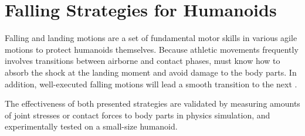 \section{Falling Strategies for Humanoids}
Falling and landing motions are a set of fundamental motor skills
in various agile motions to protect humanoids themselves.
Because athletic movements frequently involves
transitions between airborne and contact phases,  must know
how to absorb the shock at the landing moment and avoid damage to the body
parts. 
In addition, well-executed falling motions will lead a smooth transition to the
next .

The effectiveness of both presented strategies are validated by measuring
amounts of joint stresses or contact forces to body parts in physics
simulation, and experimentally tested on a small-size humanoid.

